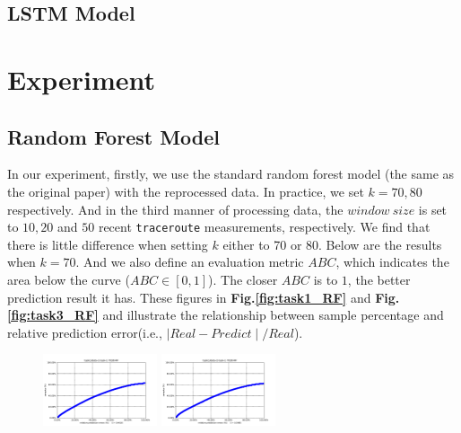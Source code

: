 \documentclass[sigconf]{acmart}
\begin{document}
	\subsection{LSTM Model}
	
	\section{Experiment}
	\subsection{Random Forest Model}
	In our experiment, firstly, we use the standard random forest model (the same as the original paper) with the reprocessed data.  In practice, we set $k = 70, 80$ respectively. And in the third manner of processing data, the $window\ size$ is set to $10,20$ and $50$ recent \texttt{traceroute} measurements, respectively. We find that there is little difference when setting $k$ either to 70 or 80. Below are the results when $k = 70$. And we also define an evaluation metric $ABC$, which indicates the  area below the curve ($ABC\in[0,1]$). The closer $ABC$ is to $1$, the better prediction result it has. These figures in \textbf{Fig.\ref{fig:task1_RF}} and \textbf{Fig.\ref{fig:task3_RF}} and  illustrate the relationship between sample percentage and relative prediction error(i.e., $\mid Real - Predict\mid/ Real $). 
	\begin{figure} [!htb] 
		\centering  
		\includegraphics[width=0.3\textwidth]{fig4/data-1-task-1-7030-RF.pdf}  
		\includegraphics[width=0.3\textwidth]{fig4/data-2-task-1-7030-RF.pdf} 
	\end{figure} 
\end{document}
